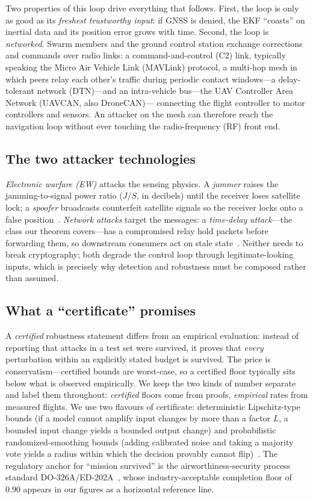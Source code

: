 Two properties of this loop drive everything that follows. First, the loop is
only as good as its \emph{freshest trustworthy input}: if GNSS is denied, the
EKF ``coasts'' on inertial data and its position error grows with time. Second,
the loop is \emph{networked}. Swarm members and the ground control station
exchange corrections and commands over radio links: a command-and-control (C2) link, typically
speaking the Micro Air Vehicle Link (MAVLink) protocol, a multi-hop mesh in which peers relay each other's traffic
during periodic contact windows---a delay-tolerant network (DTN)---and an
intra-vehicle bus---the UAV Controller Area Network (UAVCAN, also DroneCAN)---
connecting the flight controller to motor controllers and sensors. An attacker on the mesh can therefore reach the
navigation loop without ever touching the radio-frequency (RF) front end.

\subsection{The two attacker technologies}
\emph{Electronic warfare (EW)} attacks the sensing physics. A \emph{jammer}
raises the jamming-to-signal power ratio ($J/S$, in decibels) until the
receiver loses satellite lock; a \emph{spoofer}
broadcasts counterfeit satellite signals so the receiver locks onto a false
position~\cite{humphreys2008assessing,kerns2014capture}. \emph{Network attacks}
target the messages: a \emph{time-delay attack}---the class our theorem
covers---has a compromised relay hold packets before forwarding them, so
downstream consumers act on stale state~\cite{lou2019timedelay,datamut2026}.
Neither needs to break cryptography; both degrade the control loop through
legitimate-looking inputs, which is precisely why detection and robustness must
be composed rather than assumed.

\subsection{What a ``certificate'' promises}
A \emph{certified} robustness statement differs from an empirical evaluation:
instead of reporting that attacks in a test set were survived, it proves that
\emph{every} perturbation within an explicitly stated budget is survived. The
price is conservatism---certified bounds are worst-case, so a certified floor
typically sits below what is observed empirically. We keep the two kinds of
number separate and label them throughout: \emph{certified} floors come from
proofs, \emph{empirical} rates from measured flights. We use two flavours of
certificate: deterministic Lipschitz-type bounds (if a model cannot amplify
input changes by more than a factor $L$, a bounded input change yields a bounded
output change) and probabilistic randomized-smoothing bounds (adding calibrated
noise and taking a majority vote yields a radius within which the decision
provably cannot flip)~\cite{cohen2019smoothing}. The regulatory anchor for
``mission survived'' is the airworthiness-security process standard
DO-326A/ED-202A~\cite{do326a}, whose industry-acceptable completion floor of
$0.90$ appears in our figures as a horizontal reference line.


